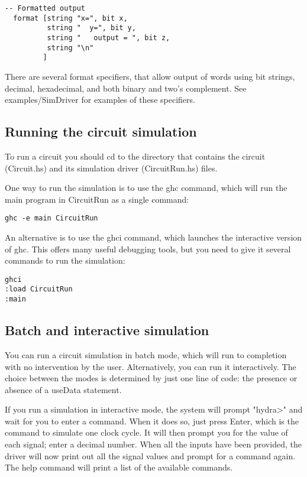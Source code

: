 \documentclass[11pt]{article}
\begin{document}
\begin{verbatim}
-- Formatted output
  format [string "x=", bit x,
          string "  y=", bit y,
          string "   output = ", bit z,
          string "\n"
         ]
\end{verbatim}

There are several format specifiers, that allow output of words using
bit strings, decimal, hexadecimal, and both binary and two's
complement.  See examples/SimDriver for examples of these specifiers.

\subsection{Running the circuit simulation}
\label{sec:orgfd19711}

To run a circuit you should cd to the directory that
contains the circuit (Circuit.hs) and its simulation driver
(CircuitRun.hs) files.

One way to run the simulation is to use the ghc command, which will
run the main program in CircuitRun as a single command:

\begin{verbatim}
ghc -e main CircuitRun
\end{verbatim}

An alternative is to use the ghci command, which launches the
interactive version of ghc.  This offers many useful debugging tools,
but you need to give it several commands to run the simulation:

\begin{verbatim}
ghci
:load CircuitRun
:main
\end{verbatim}

\subsection{Batch and interactive simulation}
\label{sec:orge76a555}


You can run a circuit simulation in batch mode, which will run to
completion with no intervention by the user.  Alternatively, you can
run it interactively.  The choice between the modes is determined by
just one line of code: the presence or absence of a useData statement.

If you run a simulation in interactive mode, the system will prompt
"hydra>" and wait for you to enter a command.  When it does so, just
press Enter, which is the command to simulate one clock cycle.  It
will then prompt you for the value of each signal; enter a decimal
number.  When all the inputs have been provided, the driver will now
print out all the signal values and prompt for a command again.  The
help command will print a list of the available commands.
\end{document}
